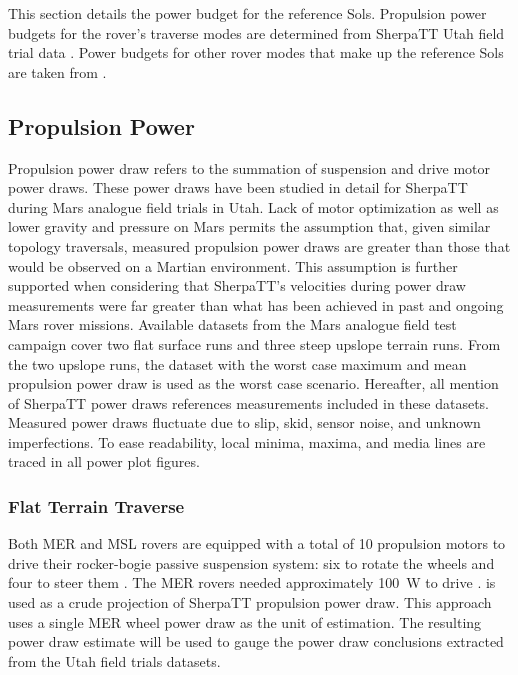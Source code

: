 This section details the power budget for the reference Sols. Propulsion power budgets for the rover's traverse modes are determined from SherpaTT Utah field trial data . Power budgets for other rover modes that make up the reference Sols are taken from .


\subsection{Propulsion Power}
\label{sec:PowerBudget:PropulsionPowerBudget}
Propulsion power draw refers to the summation of suspension and drive motor power draws. These power draws have been studied in detail for SherpaTT during Mars analogue field trials in Utah. Lack of motor optimization as well as lower gravity and pressure on Mars permits the assumption that, given similar topology traversals, measured propulsion power draws are greater than those that would be observed on a Martian environment. This assumption is further supported when considering that SherpaTT's velocities during power draw measurements were far greater than what has been achieved in past and ongoing Mars rover missions. Available datasets from the Mars analogue field test campaign cover two flat surface runs and three steep upslope terrain runs. From the two upslope runs, the dataset with the worst case maximum and mean propulsion power draw is used as the worst case scenario. Hereafter, all mention of SherpaTT power draws references measurements included in these datasets. Measured power draws fluctuate due to slip, skid, sensor noise, and unknown imperfections. To ease readability, local minima, maxima, and media lines are traced in all power plot figures.

\subsubsection{Flat Terrain Traverse}
\label{sec:PowerBudget:PropulsionPowerBudget:FlatTerrainTraverse}
Both \ac{MER} and \ac{MSL} rovers are equipped with a total of 10 propulsion motors to drive their rocker-bogie passive suspension system: six to rotate the wheels and four to steer them  . The \ac{MER} rovers needed approximately \SI{100}{\watt} to drive .  is used as a crude projection of SherpaTT propulsion power draw. This approach uses a single \ac{MER} wheel power draw as the unit of estimation. The resulting power draw estimate will be used to gauge the power draw conclusions extracted from the Utah field trials datasets.

